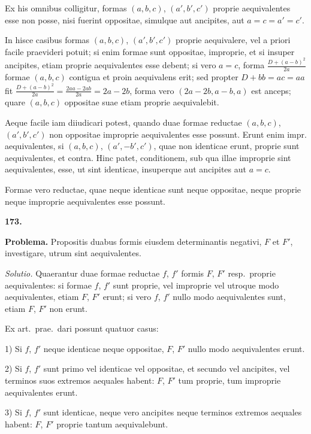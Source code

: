 \documentclass[12pt,a4paper]{article}
\theoremstyle{plain}
\begin{document}
\medskip

Ex his omnibus colligitur, formas $(a,b,c)$, $(a',b',c')$ proprie aequivalentes esse non posse, nisi fuerint oppositae, simulque aut ancipites, aut $a = c = a' = c'$.

In hisce casibus formas $(a,b,c)$, $(a',b',c')$ proprie aequivalere, vel a priori facile praevideri potuit; si enim formae sunt oppositae, improprie, et si insuper ancipites, etiam proprie aequivalentes esse debent; si vero $a = c$, forma $\frac{D+(a-b)^2}{2a}$ formae $(a,b,c)$ contigua et proin aequivalens erit; sed propter $D + bb = ac = aa$ fit $\frac{D+(a-b)^2}{2a} = \frac{2aa - 2ab}{2a} = 2a - 2b$, forma vero $(2a-2b, a-b, a)$ est anceps; quare $(a,b,c)$ oppositae suae etiam proprie aequivalebit.

Aeque facile iam diiudicari potest, quando duae formae reductae $(a,b,c)$, $(a',b',c')$ non oppositae improprie aequivalentes esse possunt. Erunt enim impr. aequivalentes, si $(a,b,c)$, $(a',-b',c')$, quae non identicae erunt, proprie sunt aequivalentes, et contra. Hinc patet, conditionem, sub qua illae improprie sint aequivalentes, esse, ut sint identicae, insuperque aut ancipites aut $a = c$.

Formae vero reductae, quae neque identicae sunt neque oppositae, neque proprie neque improprie aequivalentes esse possunt.

\bigskip

\textbf{173.}

\textbf{Problema.} Propositis duabus formis eiusdem determinantis negativi, $F$ et $F'$, investigare, utrum sint aequivalentes.

\textit{Solutio.} Quaerantur duae formae reductae $f$, $f'$ formis $F$, $F'$ resp.~proprie aequivalentes: si formae $f$, $f'$ sunt proprie, vel improprie vel utroque modo aequivalentes, etiam $F$, $F'$ erunt; si vero $f$, $f'$ nullo modo aequivalentes sunt, etiam $F$, $F'$ non erunt.

Ex art.~prae.~dari possunt quatuor casus:

1) Si $f$, $f'$ neque identicae neque oppositae, $F$, $F'$ nullo modo aequivalentes erunt.

2) Si $f$, $f'$ sunt primo vel identicae vel oppositae, et secundo vel ancipites, vel terminos suos extremos aequales habent: $F$, $F'$ tum proprie, tum improprie aequivalentes erunt.

3) Si $f$, $f'$ sunt identicae, neque vero ancipites neque terminos extremos aequales habent: $F$, $F'$ proprie tantum aequivalebunt.
\end{document}
